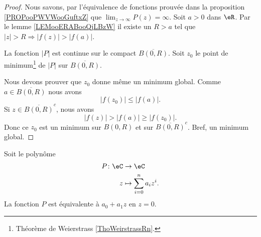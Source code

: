 \begin{proof}
	Nous savons, par l'équivalence de fonctions prouvée dans la proposition \ref{PROPooPWVWooGuftxZ} que \( \lim_{z\to \infty} P(z)=\infty\). Soit \( a>0\) dans \( \eR\). Par le lemme \ref{LEMooERABooQjLBzW} il existe un \( R>a\) tel que \( | z |>R\Rightarrow | f(z) |>| f(a) |\).

	La fonction \( | P |\) est continue sur le compact \( \overline{ B(0,R) }\). Soit \( z_0\) le point de minimum\footnote{Théorème de Weierstrass \ref{ThoWeirstrassRn}.} de \( | P |\) sur \( \overline{ B(0,R) }\).

	Nous devons prouver que \( z_0\) donne même un minimum global. Comme \( a\in\overline{ B(0,R) }\) nous avons
	\begin{equation}
		| f(z_0) |\leq | f(a) |.
	\end{equation}
	Si \( z\in \overline{ B(0,R) }^c\), nous avons
	\begin{equation}
		| f(z) |>| f(a) |\geq | f(z_0) |.
	\end{equation}
	Donc ce \( z_0\) est un minimum sur \( B(0,R)\) et sur \( \overline{ B(0,R) }^c\). Bref, un minimum global.
\end{proof}

\begin{lemma}       \label{LEMooTTOYooXaukuH}
	Soit le polynôme
	\begin{equation}
		\begin{aligned}
			P\colon \eC & \to \eC                     \\
			z           & \mapsto \sum_{i=0}^na_iz^i.
		\end{aligned}
	\end{equation}
	La fonction \( P\) est équivalente à \( a_0+a_1z\) en \( z=0\).
\end{lemma}

